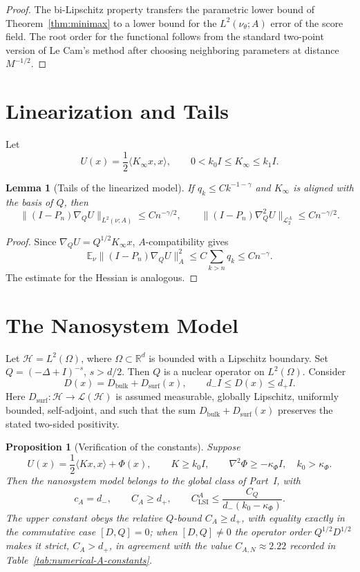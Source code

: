 \documentclass{article}
\newtheorem{lemma}[theorem]{Lemma}
\newtheorem{proposition}[theorem]{Proposition}
\newcommand{\Hh}{\mathcal H}
\newcommand{\LL}{\mathcal L}
\newcommand{\LLtwo}{\mathcal L_2}
\newcommand{\E}{\mathbb E}
\begin{document}
\begin{proof}
The bi-Lipschitz property transfers the parametric lower bound of
Theorem~\ref{thm:minimax} to a lower bound for the \(L^2(\nu_\theta;A)\) error of
the score field. The root order for the functional follows from the standard
two-point version of Le Cam's method after choosing neighboring parameters at
distance \(M^{-1/2}\).
\end{proof}

\section{Linearization and Tails}

Let
\[
        U(x)=\frac12\langle K_\infty x,x\rangle,
        \qquad 0<k_0I\le K_\infty\le k_1I.
\]

\begin{lemma}[Tails of the linearized model]
\label{lem:linear-tail}
If \(q_k\le Ck^{-1-\gamma}\) and \(K_\infty\) is aligned with the basis of \(Q\), then
\[
        \|(I-P_n)\nabla_QU\|_{L^2(\nu;A)}
        \le Cn^{-\gamma/2},
        \qquad
        \|(I-P_n)\nabla_Q^2U\|_{\LLtwo^A}
        \le Cn^{-\gamma/2}.
\]
\end{lemma}

\begin{proof}
Since \(\nabla_QU=Q^{1/2}K_\infty x\), \(A\)-compatibility gives
\[
        \E_\nu\|(I-P_n)\nabla_QU\|_A^2
        \le C\sum_{k>n}q_k\le Cn^{-\gamma}.
\]
The estimate for the Hessian is analogous.
\end{proof}

\section{The Nanosystem Model}

Let \(\Hh=L^2(\Omega)\), where \(\Omega\subset\mathbb R^d\) is bounded with a
Lipschitz boundary. Set \(Q=(-\Delta+I)^{-s}\), \(s>d/2\). Then \(Q\) is a
nuclear operator on \(L^2(\Omega)\). Consider
\[
        D(x)=D_{\mathrm{bulk}}+D_{\mathrm{surf}}(x),
        \qquad
        d_-I\le D(x)\le d_+I .
\]
Here \(D_{\mathrm{surf}}:\Hh\to\LL(\Hh)\) is assumed measurable, globally
Lipschitz, uniformly bounded, self-adjoint, and such that the sum
\(D_{\mathrm{bulk}}+D_{\mathrm{surf}}(x)\) preserves the stated two-sided
positivity.

\begin{proposition}[Verification of the constants]
\label{prop:nano}
Suppose
\[
        U(x)=\frac12\langle Kx,x\rangle+\Phi(x),
        \qquad K\ge k_0I,\qquad \nabla^2\Phi\ge-\kappa_\Phi I,
        \quad k_0>\kappa_\Phi .
\]
Then the nanosystem model belongs to the global class of Part~I, with
\[
        c_A=d_-,
        \qquad
        C_A\ge d_+,
        \qquad
        C_{\mathrm{LSI}}^A
        \le
        \frac{C_Q}{d_-(k_0-\kappa_\Phi)} .
\]
The upper constant obeys the relative \(Q\)-bound \(C_A\ge d_+\), with equality
exactly in the commutative case \([D,Q]=0\); when \([D,Q]\neq0\) the operator order
\(Q^{1/2}D^{1/2}\) makes it strict, \(C_A>d_+\), in agreement with the value
\(C_{A,N}\approx2.22\) recorded in Table~\ref{tab:numerical-A-constants}.
\end{proposition}
\end{document}
